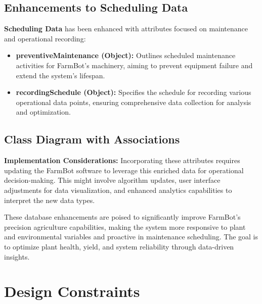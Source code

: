 \subsection{Enhancements to Scheduling Data}

\textbf{Scheduling Data} has been enhanced with attributes focused on maintenance and operational recording:

\begin{itemize}
    \item \textbf{preventiveMaintenance (Object):} Outlines scheduled maintenance activities for FarmBot's machinery, aiming to prevent equipment failure and extend the system's lifespan.
    \item \textbf{recordingSchedule (Object):} Specifies the schedule for recording various operational data points, ensuring comprehensive data collection for analysis and optimization.
\end{itemize}

\subsection{Class Diagram with Associations}

\textbf{Implementation Considerations:}
Incorporating these attributes requires updating the FarmBot software to leverage this enriched data for operational decision-making. This might involve algorithm updates, user interface adjustments for data visualization, and enhanced analytics capabilities to interpret the new data types.

These database enhancements are poised to significantly improve FarmBot's precision agriculture capabilities, making the system more responsive to plant and environmental variables and proactive in maintenance scheduling. The goal is to optimize plant health, yield, and system reliability through data-driven insights.


\section{Design Constraints}


